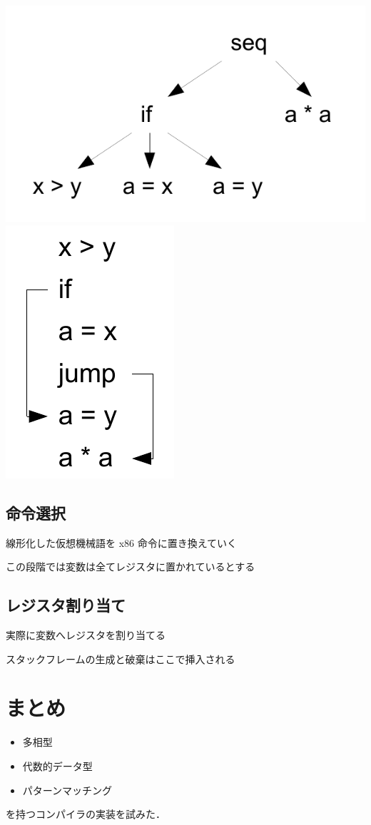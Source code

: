 \documentclass[papersize,30pt,slide]{jsarticle}
\begin{document}
\includegraphics[scale=0.3]{instree.pdf}
\includegraphics[scale=0.3]{insliner.pdf}

\subsection{命令選択}
線形化した仮想機械語を x86 命令に置き換えていく

この段階では変数は全てレジスタに置かれているとする

\subsection{レジスタ割り当て}
実際に変数へレジスタを割り当てる

スタックフレームの生成と破棄はここで挿入される

\section{まとめ}
\begin{itemize}
 \item 多相型
 \item 代数的データ型
 \item パターンマッチング
\end{itemize}
を持つコンパイラの実装を試みた．
\end{document}
